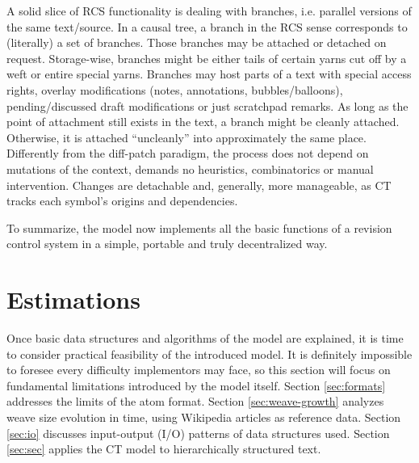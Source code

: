 \documentclass{sig-alternate}
\begin{document}

A solid slice of RCS functionality is dealing with branches, i.e. parallel versions of the same text/source.
In a causal tree, a branch in the RCS sense corresponds to (literally) a set of branches.
Those branches may be attached or detached on request.
Storage-wise, branches might be either tails of certain yarns cut off by a weft or entire special yarns.
Branches may host parts of a text with special access rights, overlay modifications (notes, annotations, bubbles/balloons), pending/discussed draft modifications or just scratchpad remarks.
As long as the point of attachment still exists in the text, a branch might be cleanly attached.
Otherwise, it is attached ``uncleanly'' into approximately the same place.
Differently from the diff-patch paradigm, the process does not depend on mutations of the context, demands no heuristics, combinatorics or manual intervention. Changes are detachable and, generally, more manageable, as CT tracks each symbol's origins and dependencies.

To summarize, the model now implements all the basic functions of a revision control system in a simple, portable and truly decentralized way.

\section{Estimations} \label{sec:estim}

Once basic data structures and algorithms of the model are explained,
it is time to consider practical feasibility of the introduced model.
It is definitely impossible to foresee every difficulty implementors may face, so this section will focus on fundamental limitations introduced by the model itself.
Section \ref{sec:formats} addresses the limits of the atom format.
Section \ref{sec:weave-growth} analyzes weave size evolution in time, using Wikipedia articles as reference data.
Section \ref{sec:io} discusses input-output (I/O) patterns of data structures used.
Section \ref{sec:sec} applies the CT model to hierarchically structured text.
\end{document}
